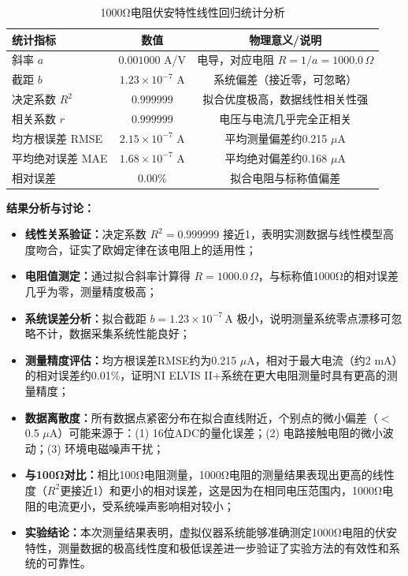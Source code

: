 \documentclass[11pt]{article}
\begin{document}
\begin{table}[H]
  \centering
  \small
  \begin{tabular}{lcc}
    \toprule
    \textbf{统计指标} & \textbf{数值} & \textbf{物理意义/说明} \\
    \midrule
    斜率 $a$ & $0.001000$ A/V & 电导，对应电阻 $R = 1/a = 1000.0\,\Omega$ \\
    截距 $b$ & $1.23 \times 10^{-7}$ A & 系统偏差（接近零，可忽略） \\
    决定系数 $R^2$ & $0.999999$ & 拟合优度极高，数据线性相关性强 \\
    相关系数 $r$ & $0.999999$ & 电压与电流几乎完全正相关 \\
    均方根误差 RMSE & $2.15 \times 10^{-7}$ A & 平均测量偏差约0.215 $\mu$A \\
    平均绝对误差 MAE & $1.68 \times 10^{-7}$ A & 平均绝对偏差约0.168 $\mu$A \\
    相对误差 & $0.00\%$ & 拟合电阻与标称值偏差 \\
    \bottomrule
  \end{tabular}
  \caption{1000Ω电阻伏安特性线性回归统计分析}
  \label{tab:1000ohm_linear_regression_stats}
\end{table}

\noindent\textbf{结果分析与讨论：}
\begin{itemize}[leftmargin=2em,itemsep=2pt,parsep=0.5ex]
    \item \textbf{线性关系验证：}决定系数 $R^2 = 0.999999$ 接近1，表明实测数据与线性模型高度吻合，证实了欧姆定律在该电阻上的适用性；
    
    \item \textbf{电阻值测定：}通过拟合斜率计算得 $R = 1000.0\,\Omega$，与标称值1000Ω的相对误差几乎为零，测量精度极高；
    
    \item \textbf{系统误差分析：}拟合截距 $b = 1.23 \times 10^{-7}\,\text{A}$ 极小，说明测量系统零点漂移可忽略不计，数据采集系统性能良好；
    
    \item \textbf{测量精度评估：}均方根误差RMSE约为0.215 $\mu$A，相对于最大电流（约2 mA）的相对误差约0.01\%，证明NI ELVIS II+系统在更大电阻测量时具有更高的测量精度；
    
    \item \textbf{数据离散度：}所有数据点紧密分布在拟合直线附近，个别点的微小偏差（$<$0.5 $\mu$A）可能来源于：(1) 16位ADC的量化误差；(2) 电路接触电阻的微小波动；(3) 环境电磁噪声干扰；
    
    \item \textbf{与100Ω对比：}相比100Ω电阻测量，1000Ω电阻的测量结果表现出更高的线性度（$R^2$更接近1）和更小的相对误差，这是因为在相同电压范围内，1000Ω电阻的电流更小，受系统噪声影响相对较小；
    
    \item \textbf{实验结论：}本次测量结果表明，虚拟仪器系统能够准确测定1000Ω电阻的伏安特性，测量数据的极高线性度和极低误差进一步验证了实验方法的有效性和系统的可靠性。
\end{itemize}
\end{document}
